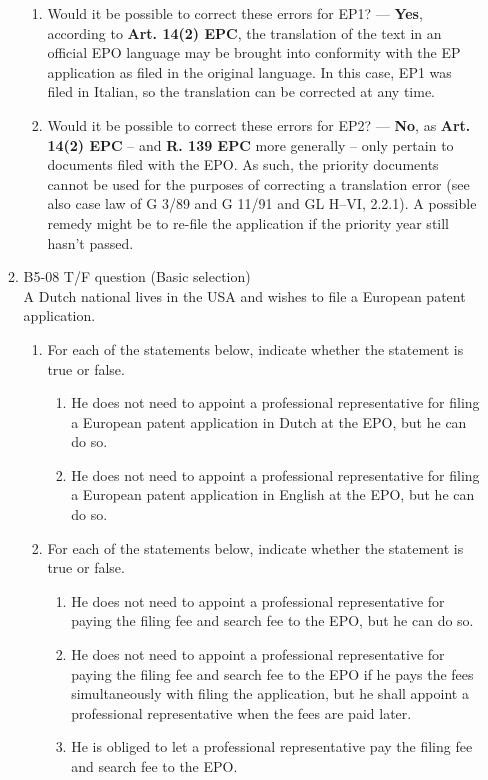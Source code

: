 \documentclass{report}
\begin{document}
\begin{enumerate}[label=\textbf{Answer \arabic*}]
\begin{enumerate}[label=\textbf{Answer \arabic*}]
    \begin{enumerate}[label=(\alph*)]
        \item Would it be possible to correct these errors for EP1? --- \textbf{Yes}, according to \textbf{Art. 14(2) EPC}, the translation of the text in an official EPO language may be brought into conformity with the EP application as filed in the original language. In this case, EP1 was filed in Italian, so the translation can be corrected at any time. 
        \item Would it be possible to correct these errors for EP2? --- \textbf{No}, as \textbf{Art. 14(2) EPC} -- and \textbf{R. 139 EPC} more generally -- only pertain to documents filed with the EPO. As such, the priority documents cannot be used for the purposes of correcting a translation error (see also case law of \textsc{G 3/89} and \textsc{G 11/91} and \textsc{GL H--VI, 2.2.1}). A possible remedy might be to re-file the application if the priority year still hasn't passed. 
    \end{enumerate}

    \item %
    B5-08 \quad T/F question (Basic selection) \\
    A Dutch national lives in the USA and wishes to file a European patent application.
    
    \begin{enumerate}[label=(\alph*)]
        \item For each of the statements below, indicate whether the statement is true or false.
        \begin{enumerate}[label={(\alph{enumi}.\arabic*)}]
            \item He does not need to appoint a professional representative for filing a European patent application in Dutch at the EPO, but he can do so.
            \item He does not need to appoint a professional representative for filing a European patent application in English at the EPO, but he can do so.
        \end{enumerate}
        
        \item For each of the statements below, indicate whether the statement is true or false.
        \begin{enumerate}[label={(\alph{enumi}.\arabic*)}]
            \item He does not need to appoint a professional representative for paying the filing fee and search fee to the EPO, but he can do so.
            \item He does not need to appoint a professional representative for paying the filing fee and search fee to the EPO if he pays the fees simultaneously with filing the application, but he shall appoint a professional representative when the fees are paid later.
            \item He is obliged to let a professional representative pay the filing fee and search fee to the EPO.
        \end{enumerate}
        

\end{enumerate}
\end{enumerate}
\end{enumerate}
\end{document}
